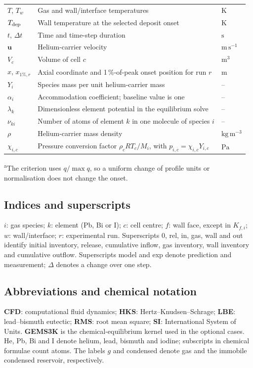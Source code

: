 \documentclass[10pt,a4paper]{article}
\begin{document}
{\begin{tabularx}{\textwidth}{@{}p{2.2cm}>{\raggedright\arraybackslash}X>{\raggedright\arraybackslash}p{2.6cm}@{}}
$T$, $T_w$ & Gas and wall/interface temperatures & $\mathrm{K}$ \\
$T_{\rm dep}$ & Wall temperature at the selected deposit onset & $\mathrm{K}$ \\
$t$, $\Delta t$ & Time and time-step duration & $\mathrm{s}$ \\
$\mathbf u$ & Helium-carrier velocity & $\mathrm{m\,s^{-1}}$ \\
$V_c$ & Volume of cell $c$ & $\mathrm{m^3}$ \\
$x$, $x_{1\%,r}$ & Axial coordinate and 1\,\%-of-peak onset position for run $r$ & $\mathrm{m}$ \\
$Y_i$ & Species mass per unit helium-carrier mass & -- \\
$\alpha_i$ & Accommodation coefficient; baseline value is one & -- \\
$\lambda_k$ & Dimensionless element potential in the equilibrium solve & -- \\
$\nu_{ki}$ & Number of atoms of element $k$ in one molecule of species $i$ & -- \\
$\rho$ & Helium-carrier mass density & $\mathrm{kg\,m^{-3}}$ \\
$\chi_{i,c}$ & Pressure conversion factor $\rho_cRT_c/M_i$, with $p_{i,c}=\chi_{i,c}Y_{i,c}$ & $\mathrm{Pa}$ \\
\bottomrule
\end{tabularx}

\textsuperscript{a}The criterion uses $q/\max q$, so a uniform change of
profile units or normalisation does not change the onset.

\subsection{Indices and superscripts}
$i$: gas species; $k$: element (Pb, Bi or I); $c$: cell centre;
$f$: wall face, except in $K_{f,i}$; $w$: wall/interface;
$r$: experimental run. Superscripts $0$, rel, in, gas, wall and out
identify initial inventory, release, cumulative inflow, gas inventory,
wall inventory and cumulative outflow. Superscripts model and exp denote
prediction and measurement; $\Delta$ denotes a change over one step.

\subsection{Abbreviations and chemical notation}
\textbf{CFD}: computational fluid dynamics; \textbf{HKS}:
Hertz--Knudsen--Schrage; \textbf{LBE}: lead--bismuth eutectic;
\textbf{RMS}: root mean square; \textbf{SI}: International System of Units.
\textbf{GEMS3K} is the chemical-equilibrium kernel used in the optional cases.
He, Pb, Bi and I denote helium, lead, bismuth and iodine; subscripts in
chemical formulae count atoms. The labels $g$ and condensed denote gas
and the immobile condensed reservoir, respectively.
}
\end{document}
